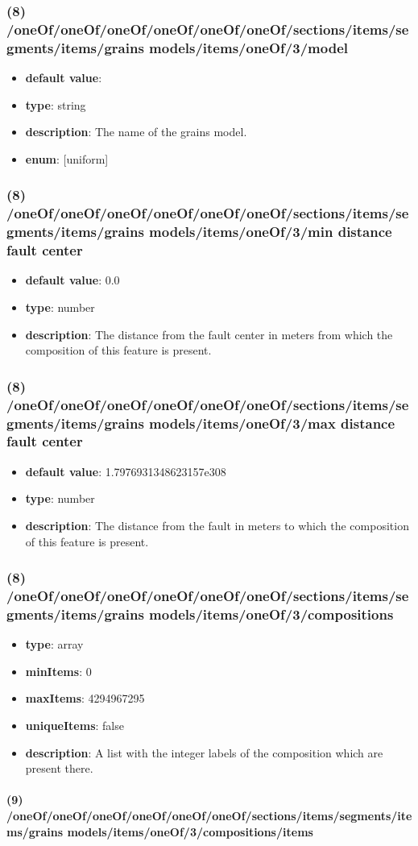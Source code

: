 \subsubsection{(8) /oneOf/oneOf/oneOf/oneOf/oneOf/oneOf/sections/items/segments/items/grains models/items/oneOf/3/model}
\begin{itemize}[leftmargin=8em]\item {\bf default value}: 
\item {\bf type}: string
\item {\bf description}: The name of the grains model.
\item {\bf enum}: [uniform]\end{itemize}\subsubsection{(8) /oneOf/oneOf/oneOf/oneOf/oneOf/oneOf/sections/items/segments/items/grains models/items/oneOf/3/min distance fault center}
\begin{itemize}[leftmargin=8em]\item {\bf default value}: 0.0
\item {\bf type}: number
\item {\bf description}: The distance from the fault center in meters from which the composition of this feature is present.
\end{itemize}\subsubsection{(8) /oneOf/oneOf/oneOf/oneOf/oneOf/oneOf/sections/items/segments/items/grains models/items/oneOf/3/max distance fault center}
\begin{itemize}[leftmargin=8em]\item {\bf default value}: 1.7976931348623157e308
\item {\bf type}: number
\item {\bf description}: The distance from the fault in meters to which the composition of this feature is present.
\end{itemize}\subsubsection{(8) /oneOf/oneOf/oneOf/oneOf/oneOf/oneOf/sections/items/segments/items/grains models/items/oneOf/3/compositions}
\begin{itemize}[leftmargin=8em]\item {\bf type}: array
\item {\bf minItems}: 0
\item {\bf maxItems}: 4294967295
\item {\bf uniqueItems}: false
\item {\bf description}: A list with the integer labels of the composition which are present there.
\end{itemize}\paragraph{(9) /oneOf/oneOf/oneOf/oneOf/oneOf/oneOf/sections/items/segments/items/grains models/items/oneOf/3/compositions/items}
